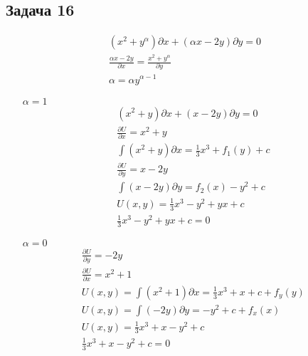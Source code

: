 \subsection*{Задача 16}
\begin{gather*}
	(x^2 + y^{\alpha}) \partial x + (\alpha x - 2y) \partial y = 0\\
	\frac{\alpha x - 2y}{\partial x} = \frac{x^2 + y^\alpha}{\partial y}\\
	\alpha = \alpha y^{\alpha - 1}
\end{gather*}
\begin{enumerate}
	\item[$\alpha = 1$] 
		\begin{gather*}
			(x^2 + y) \partial x + (x - 2y) \partial y = 0\\
			\frac{\partial U}{\partial x} = x^2 + y\\
			\int (x^2 + y) \partial x = \frac{1}{3} x^3 + f_1(y) + c\\
			\frac{\partial U}{\partial y} = x - 2y\\
			\int (x - 2y) \partial y = f_2(x) - y^2 + c\\
			U(x,y) = \frac{1}{3}x^3 - y^2 + yx + c\\
			\frac{1}{3}x^3 - y^2 + yx + c = 0
		\end{gather*}
	\item[$\alpha = 0$]
		\begin{gather*}
			\frac{\partial U}{\partial y} = -2y\\
			\frac{\partial U}{\partial x} = x^2 + 1\\
			U(x,y) = \int(x^2+1) \partial x = \frac{1}{3} x^3 + x + c + f_y(y)\\
			U(x,y) = \int(-2y) \partial y = -y^2 + c + f_x(x)\\
			U(x,y) = \frac{1}{3} x^3 + x - y^2 + c\\
			\frac{1}{3} x^3 + x - y^2 + c = 0
		\end{gather*}
\end{enumerate}


